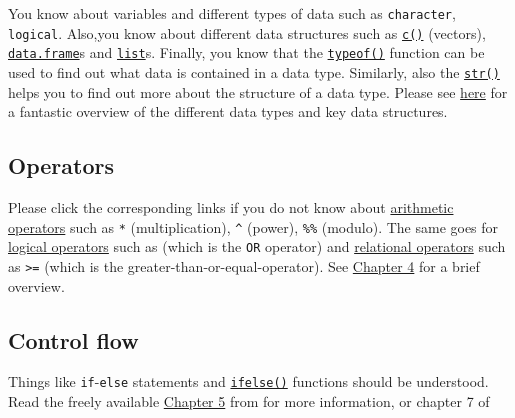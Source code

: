 \documentclass[
]{book}
\begin{document}
You know about variables and different types of data such as \texttt{character}, \texttt{logical}. Also,you know about different data structures such as \href{https://stat.ethz.ch/R-manual/R-devel/library/base/html/c.html}{\texttt{c()}} (vectors), \href{https://stat.ethz.ch/R-manual/R-devel/library/base/html/data.frame.html}{\texttt{data.frame}}s and \href{https://stat.ethz.ch/R-manual/R-devel/library/base/html/list.html}{\texttt{list}}s. Finally, you know that the \href{https://stat.ethz.ch/R-manual/R-devel/library/base/html/typeof.html}{\texttt{typeof()}} function can be used to find out what data is contained in a data type. Similarly, also the \href{https://stat.ethz.ch/R-manual/R-devel/library/utils/html/str.html}{\texttt{str()}} helps you to find out more about the structure of a data type. Please see \href{https://swcarpentry.github.io/r-novice-inflammation/13-supp-data-structures/}{here} for a fantastic overview of the different data types and key data structures.

\hypertarget{operators}{%
\subsection{Operators}\label{operators}}

Please click the corresponding links if you do not know about \href{https://stat.ethz.ch/R-manual/R-devel/library/base/html/Arithmetic.html}{arithmetic operators} such as \texttt{*} (multiplication), \texttt{\^{}} (power), \texttt{\%\%} (modulo). The same goes for \href{https://stat.ethz.ch/R-manual/R-devel/library/base/html/Logic.html}{logical operators} such as \texttt{\textbar{}\textbar{}} (which is the \texttt{OR} operator) and \href{https://stat.ethz.ch/R-manual/R-devel/library/base/html/Comparison.html}{relational operators} such as \texttt{\textgreater{}=} (which is the greater-than-or-equal-operator). See \href{https://bookdown.org/swen/R_for_Everyone/L03.html\#r-as-a-calculator}{Chapter 4} for a brief overview.

\hypertarget{control-flow}{%
\subsection{Control flow}\label{control-flow}}

Things like \texttt{if}-\texttt{else} statements and \href{https://stat.ethz.ch/R-manual/R-devel/library/base/html/ifelse.html}{\texttt{ifelse()}} functions should be understood. Read the freely available \href{https://adv-r.hadley.nz/control-flow.html}{Chapter 5} from \citep{Wickham2019} for more information, or chapter 7 of \citep{Matloff2011}
\end{document}
